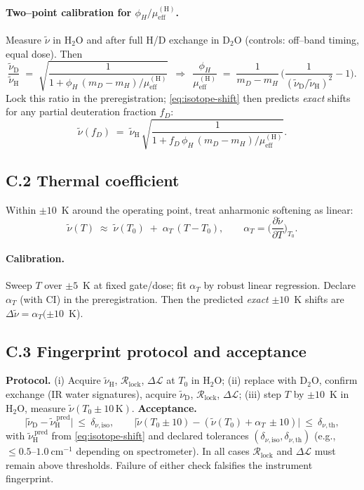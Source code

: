\documentclass[11pt]{article}
\begin{document}
\paragraph{Two–point calibration for $\phi_H/\mu_{\mathrm{eff}}^{\mathrm{(H)}}$.}
Measure $\tilde\nu$ in H$_2$O and after full H/D exchange in D$_2$O (controls: off–band timing, equal dose). Then
\[
\frac{\tilde\nu_{\mathrm{D}}}{\tilde\nu_{\mathrm{H}}}\;=\; \sqrt{\frac{1}{1+\phi_H\,(m_D-m_H)/\mu_{\mathrm{eff}}^{\mathrm{(H)}}}}\ \ \Longrightarrow\ \
\frac{\phi_H}{\mu_{\mathrm{eff}}^{\mathrm{(H)}}}\;=\;\frac{1}{m_D-m_H}\,\Big(\frac{1}{(\tilde\nu_{\mathrm{D}}/\tilde\nu_{\mathrm{H}})^2}-1\Big).
\]
Lock this ratio in the preregistration; \eqref{eq:isotope-shift} then predicts \emph{exact} shifts for any partial deuteration fraction $f_D$:
\[
\tilde\nu(f_D)\;=\;\tilde\nu_{\mathrm{H}}\,\sqrt{\frac{1}{1+f_D\,\phi_H\,(m_D-m_H)/\mu_{\mathrm{eff}}^{\mathrm{(H)}}}}.
\]

\subsection*{C.2 Thermal coefficient}
Within $\pm 10$~K around the operating point, treat anharmonic softening as linear:
\[
\tilde\nu(T)\;\approx\;\tilde\nu(T_0)\;+\;\alpha_T\,(T-T_0),\qquad \alpha_T=\Big(\frac{\partial \tilde\nu}{\partial T}\Big)_{T_0}.
\]
\paragraph{Calibration.} Sweep $T$ over $\pm 5$~K at fixed gate/dose; fit $\alpha_T$ by robust linear regression. Declare $\alpha_T$ (with CI) in the preregistration. Then the predicted \emph{exact} $\pm 10$~K shifts are $\Delta\tilde\nu=\alpha_T(\pm 10$~K).

\subsection*{C.3 Fingerprint protocol and acceptance}
\textbf{Protocol.} (i) Acquire $\tilde\nu_{\mathrm{H}}$, $\mathcal{R}_{\mathrm{lock}}$, $\Delta\mathcal{L}$ at $T_0$ in H$_2$O; (ii) replace with D$_2$O, confirm exchange (IR water signatures), acquire $\tilde\nu_{\mathrm{D}}$, $\mathcal{R}_{\mathrm{lock}}$, $\Delta\mathcal{L}$; (iii) step $T$ by $\pm 10$~K in H$_2$O, measure $\tilde\nu(T_0\pm 10\,\mathrm{K})$.  
\textbf{Acceptance.}
\[
\Big|\tilde\nu_{\mathrm{D}}-\tilde\nu_{\mathrm{H}}^{\ \mathrm{pred}}\Big|\ \le\ \delta_{\nu,\mathrm{iso}},\qquad
\Big|\tilde\nu(T_0\!\pm\!10)-(\tilde\nu(T_0)\!+\!\alpha_T\,\pm 10)\Big|\ \le\ \delta_{\nu,\mathrm{th}},
\]
with $\tilde\nu_{\mathrm{H}}^{\ \mathrm{pred}}$ from \eqref{eq:isotope-shift} and declared tolerances $(\delta_{\nu,\mathrm{iso}},\delta_{\nu,\mathrm{th}})$ (e.g., $\le 0.5$--$1.0~\mathrm{cm^{-1}}$ depending on spectrometer). In all cases $\mathcal{R}_{\mathrm{lock}}$ and $\Delta\mathcal{L}$ must remain above thresholds. Failure of either check falsifies the instrument fingerprint.
\end{document}
